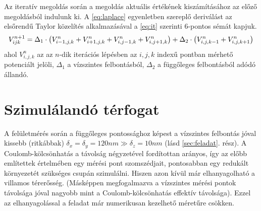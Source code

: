 	Az iteratív megoldás során a megoldás aktuális értékének kiszámításához az előző megoldásból indulunk ki.
	A \eqref{eq:laplace} egyenletben szereplő deriválást az elsőrendű Taylor közelítés alkalmazásával a
	\eqref{eq:it} szerinti 6-pontos sémát kapjuk.
	\begin{equation} \label{eq:it} 
		V_{ijk}^{n+1} = \\ \Delta_1 \cdot \left(V_{i-1,j,k}^n+V_{i+1,j,k}^n
		+V_{i,j-1,k}^n+V_{i,j+1,k}^n\right)+ \\
						\Delta_2 \cdot \left(V_{i,j,k-1}^n+V_{i,j,k+1}^n\right)
	\end{equation}
	ahol $V_{i,j,k}^n$ az az $n$-dik iterációs lépésben az $i,j,k$ indexű
	pontban mérhető potenciált jelöli, $\Delta_1$ a vízszintes felbontásból,
	$\Delta_2$ a függőleges felbontásból adódó állandó.
	

	

\section{Szimulálandó térfogat} \label{sec:sim_terfogat}
	
	A felületmérés során a függőleges pontossághoz képest a vízszintes felbontás jóval kissebb (ritkábbak)
	$\delta_x=\delta_y=120nm \gg \delta_z=10nm$ (lásd \ref{sec:feladat}. rész).
	A Coulomb-kölcsönhatás a távolság négyzetével fordítottan arányos,
	így az előbb említettek értelmében egy mérési pont szomszédjait, pontosabban egy redukált
	környezetét szükséges csupán szimulálni. Hiszen azon kívül már elhanyagolható a villamos térerősség.
	(Másképpen megfogalmazva a vízszintes mérési pontok távolsága jóval nagyobb mint a Coulomb-kölcsönhatás effektív távolsága).
	Ezzel az elhanyagolással a feladat már numerikusan kezelhető méretűre csökken.
	
